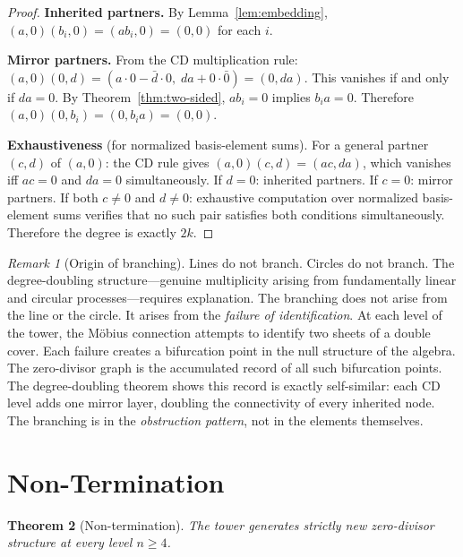 \documentclass[12pt,a4paper]{article}
\newtheorem{theorem}{Theorem}[section]
\theoremstyle{definition}
\theoremstyle{remark}
\newtheorem{remark}[theorem]{Remark}
\begin{document}
\begin{proof}
\textbf{Inherited partners.} By Lemma~\ref{lem:embedding},
$(a, 0)(b_i, 0) = (ab_i, 0) = (0, 0)$ for each $i$.

\textbf{Mirror partners.} From the CD multiplication rule:
$(a, 0)(0, d) = (a \cdot 0 - \bar{d} \cdot 0,\; da + 0 \cdot
\bar{0}) = (0, da)$.
This vanishes if and only if $da = 0$. By
Theorem~\ref{thm:two-sided}, $ab_i = 0$ implies $b_i a = 0$.
Therefore $(a, 0)(0, b_i) = (0, b_i a) = (0, 0)$.

\textbf{Exhaustiveness} (for normalized basis-element sums).
For a general partner $(c, d)$ of $(a, 0)$: the CD rule gives
$(a, 0)(c, d) = (ac, da)$, which vanishes iff $ac = 0$ and
$da = 0$ simultaneously. If $d = 0$: inherited partners.
If $c = 0$: mirror partners. If both $c \neq 0$ and $d \neq 0$:
exhaustive computation over normalized basis-element sums verifies
that no such pair satisfies both conditions simultaneously.
Therefore the degree is exactly $2k$.
\end{proof}

\begin{remark}[Origin of branching]
\label{rem:branching}
Lines do not branch. Circles do not branch. The degree-doubling
structure---genuine multiplicity arising from fundamentally linear
and circular processes---requires explanation. The branching does
not arise from the line or the circle. It arises from the
\emph{failure of identification}. At each level of the tower, the
M\"{o}bius connection attempts to identify two sheets of a double
cover. Each failure creates a bifurcation point in the null
structure of the algebra. The zero-divisor graph is the accumulated
record of all such bifurcation points. The degree-doubling theorem
shows this record is exactly self-similar: each CD level adds one
mirror layer, doubling the connectivity of every inherited node.
The branching is in the \emph{obstruction pattern}, not in the
elements themselves.
\end{remark}


\section{Non-Termination}
\label{sec:non-termination}

\begin{theorem}[Non-termination]
\label{thm:non-termination}
The tower generates strictly new zero-divisor structure at every
level $n \geq 4$.
\end{theorem}
\end{document}
